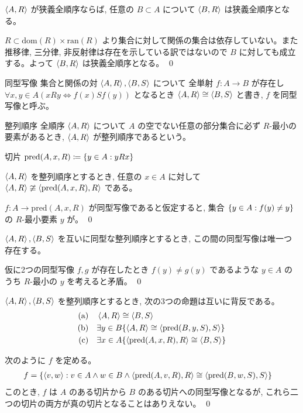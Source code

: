 \documentclass[uplatex,dvipdfmx,a4paper,11pt]{jlreq}
\makeatletter
\theoremstyle{definition}
\renewenvironment{proof}[1][\proofname]{\par
  \normalfont
  \topsep6\p@\@plus6\p@ \trivlist
  \item[\hskip\labelsep{\bfseries #1}\@addpunct{\bfseries}]\ignorespaces\quad\par
}{%
  \qed\endtrivlist\@endpefalse
}
\renewcommand\proofname{証明}
\makeatother
\begin{document}
\begin{theorem}
  $\ev{A, R}$ が狭義全順序ならば, 任意の $B\subset A$ について $\ev{B, R}$ は狭義全順序となる。
\end{theorem}
\begin{proof}
  $R\subset \mathrm{dom}(R)\times\mathrm{ran}(R)$ より集合に対して関係の集合は依存していない。また推移律, 三分律, 非反射律は存在を示している訳ではないので $B$ に対しても成立する。よって $\ev{B, R}$ は狭義全順序となる。
\end{proof}

\begin{definition}
  同型写像
  集合と関係の対 $\ev{A, R}, \ev{B, S}$ について
  全単射 $f:A\to B$ が存在し $\forall x,y\in A(xRy\iff f(x)Sf(y))$ となるとき $\ev{A,R}\cong\ev{B,S}$ と書き, $f$ を同型写像と呼ぶ。

  整列順序
  全順序 $\ev{A,R}$ について $A$ の空でない任意の部分集合に必ず $R$-最小の要素があるとき, $\ev{A,R}$ が整列順序であるという。

  切片
  $\mathrm{pred}(A,x,R)\coloneq\qty{y\in A:yRx}$
\end{definition}

\begin{theorem}
  $\ev{A,R}$ を整列順序とするとき, 任意の $x\in A$ に対して $\ev{A,R}\ncong\ev{\mathrm{pred}(A,x,R), R}$ である。
\end{theorem}
\begin{proof}
  $f:A\to\mathrm{pred}(A,x,R)$ が同型写像であると仮定すると, 集合 $\qty{y\in A:f(y)\neq y}$ の $R$-最小要素 $y$ が。
\end{proof}

\begin{theorem}
  $\ev{A,R}, \ev{B,S}$ を互いに同型な整列順序とするとき, この間の同型写像は唯一つ存在する。
\end{theorem}
\begin{proof}
  仮に2つの同型写像 $f, g$ が存在したとき $f(y)\neq g(y)$ であるような $y\in A$ のうち $R$-最小の $y$ を考えると矛盾。
\end{proof}

\begin{theorem}
  $\ev{A,R}, \ev{B,S}$ を整列順序とするとき, 次の3つの命題は互いに背反である。
  \begin{align}
    \text{(a)}\quad & \ev{A,R}\cong\ev{B,S}                                        \\
    \text{(b)}\quad & \exists y\in B\qty{\ev{A,R}\cong\ev{\mathrm{pred}(B,y,S),S}} \\
    \text{(c)}\quad & \exists x\in A\qty{\ev{\mathrm{pred}(A,x,R),R}\cong\ev{B,S}}
  \end{align}
\end{theorem}
\begin{proof}
  次のように $f$ を定める。
  \begin{align}
    f & = \qty{\ev{v, w}: v\in A\land w\in B\land\ev{\mathrm{pred}(A,v,R), R}\cong\ev{\mathrm{pred}(B,w,S),S}}
  \end{align}
  このとき, $f$ は $A$ のある切片から $B$ のある切片への同型写像となるが, これら二つの切片の両方が真の切片となることはありえない。
\end{proof}
\end{document}
